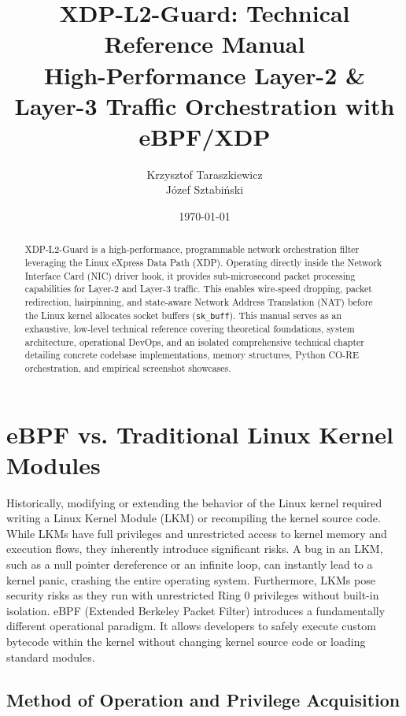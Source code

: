 \documentclass[11pt,a4paper]{article}
\title{\textbf{XDP-L2-Guard: Technical Reference Manual \\ \large High-Performance Layer-2 \& Layer-3 Traffic Orchestration with eBPF/XDP}}
\author{Krzysztof Taraszkiewicz \\ Józef Sztabiński}
\date{\today}
\begin{document}
\color{docblue} 

\maketitle

\begin{abstract}
XDP-L2-Guard is a high-performance, programmable network orchestration filter leveraging the Linux eXpress Data Path (XDP).
Operating directly inside the Network Interface Card (NIC) driver hook, it provides sub-microsecond packet processing capabilities for Layer-2 and Layer-3 traffic.
This enables wire-speed dropping, packet redirection, hairpinning, and state-aware Network Address Translation (NAT) before the Linux kernel allocates socket buffers (\texttt{sk\_buff}).
This manual serves as an exhaustive, low-level technical reference covering theoretical foundations, system architecture, operational DevOps, and an isolated comprehensive technical chapter detailing concrete codebase implementations, memory structures, Python CO-RE orchestration, and empirical screenshot showcases.
\end{abstract}

\tableofcontents
\vspace{1cm}

\section{eBPF vs. Traditional Linux Kernel Modules}

Historically, modifying or extending the behavior of the Linux kernel required writing a Linux Kernel Module (LKM) or recompiling the kernel source code.
While LKMs have full privileges and unrestricted access to kernel memory and execution flows, they inherently introduce significant risks.
A bug in an LKM, such as a null pointer dereference or an infinite loop, can instantly lead to a kernel panic, crashing the entire operating system.
Furthermore, LKMs pose security risks as they run with unrestricted Ring 0 privileges without built-in isolation.
eBPF (Extended Berkeley Packet Filter) introduces a fundamentally different operational paradigm.
It allows developers to safely execute custom bytecode within the kernel without changing kernel source code or loading standard modules.

\subsection{Method of Operation and Privilege Acquisition}
\end{document}
